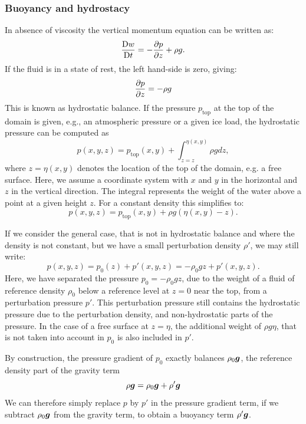 \subsubsection{Buoyancy and hydrostacy}\label{sec:buoyancy_hydrostacy}
In absence of viscosity the vertical momentum equation can be written as:
\begin{equation}\label{eq:vertmom}
\DDt[t]{w} = -\ppx[z]{p} + \rho g.
\end{equation}
If the fluid is in a state of rest, the left hand-side is zero, giving:
\begin{equation}\label{eq:hydrostatic_balance}
\ppx[z]{p} = -\rho g
\end{equation}
This is known as hydrostatic balance. If the pressure $p_{\text{top}}$ at the top of the domain
is given, e.g., an atmospheric pressure or a given ice load,
the hydrostatic pressure can be computed as
\begin{equation} \label{eq:hydrostatic_pressure}
  p(x,y,z) = p_{\text{top}}(x,y) + \int_{z=z}^{\eta(x,y)} \rho g dz,
\end{equation}
where $z=\eta(x,y)$ denotes the location of the top of the domain, e.g. a free
surface. Here, we assume a coordinate system with $x$ and $y$ in the horizontal
and $z$ in the vertical direction. The integral represents the weight of the
water above a point at a given height $z$. For a constant density this simplifies to:
\begin{equation}
  p(x,y,z) = p_{\text{top}}(x,y) + \rho g \left(\eta(x,y)-z\right).
\end{equation}

If we consider the general case, that is not in hydrostatic balance and where
the density is not constant, but we have a small perturbation density
$\rho'$, we may still write:
\begin{equation}
  p(x,y,z) = p_0(z) + p'(x,y,z) = -\rho_0 g z + p'(x,y,z).
\end{equation}
Here, we have separated the pressure $p_0=-\rho_0 g z$, due to the weight of a fluid of reference density $\rho_0$ below a reference level at $z=0$ near the top, from a perturbation pressure $p'$. This
perturbation pressure still contains the hydrostatic pressure due to the
perturbation density, and non-hydrostatic parts of the pressure. In the
case of a free surface at $z=\eta$, the additional weight of $\rho g\eta$, that
is not taken into account in $p_0$ is also included in $p'$.

By construction, the pressure gradient of $p_0$ exactly balances $\rho_0\bmg$,
the reference density part of the gravity term
\begin{equation}
  \rho\bmg=\rho_0\bmg+\rho'\bmg
\end{equation}
We can therefore simply replace $p$ by $p'$ in the pressure gradient term, if we
subtract $\rho_0\bmg$ from the gravity term, to obtain a buoyancy term
$\rho'\bmg$.


